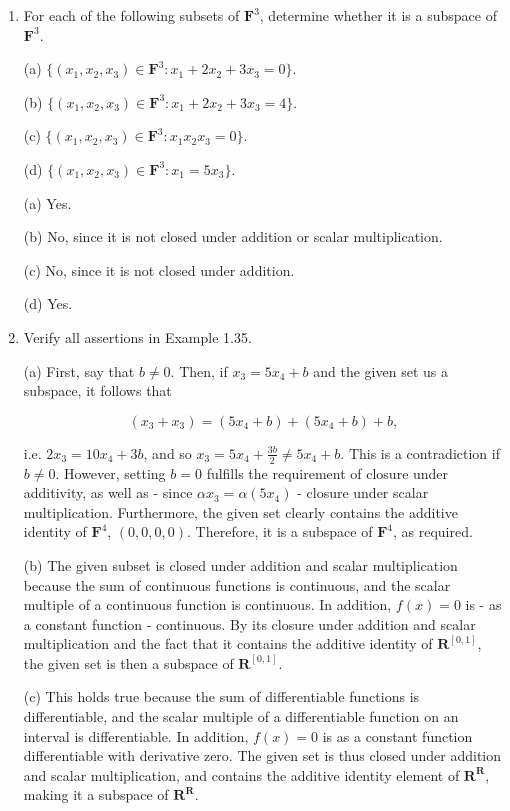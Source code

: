 \documentclass{book}
\begin{document}
\begin{enumerate}

\item For each of the following subsets of \(\textbf{F}^3\), determine whether it is a subspace of \(\textbf{F}^3\).

(a) \(\{(x_1,x_2,x_3) \in \textbf{F}^3:x_1+2x_2+3x_3=0\}\).

(b) \(\{(x_1,x_2,x_3) \in \textbf{F}^3:x_1+2x_2+3x_3=4\}\).

(c) \(\{(x_1,x_2,x_3) \in \textbf{F}^3:x_1x_2x_3=0\}\).

(d) \(\{(x_1,x_2,x_3) \in \textbf{F}^3:x_1=5x_3\}\).

(a) Yes.

(b) No, since it is not closed under addition or scalar multiplication.

(c) No, since it is not closed under addition.

(d) Yes.

\item Verify all assertions in Example 1.35.

(a) First, say that \(b \neq 0\).  Then, if \(x_3 = 5x_4 + b\) and the given set us a subspace, it follows that

\begin{equation*}
    (x_3 + x_3) = (5x_4 + b) + (5x_4 + b) + b,
\end{equation*}

i.e. \(2x_3 = 10x_4 + 3b\), and so \(x_3 = 5x_4 + \frac{3b}{2} \neq 5x_4 + b\).  This is a contradiction if \(b \neq 0\).  However, setting \(b = 0\) fulfills the requirement of closure under additivity, as well as - since \(\alpha x_3 = \alpha (5x_4)\) - closure under scalar multiplication.  Furthermore, the given set clearly contains the additive identity of \(\textbf{F}^4\), \((0,0,0,0)\).  Therefore, it is a subspace of \(\textbf{F}^4\), as required.

(b) The given subset is closed under addition and scalar multiplication because the sum of continuous functions is continuous, and the scalar multiple of a continuous function is continuous.  In addition, \(f(x)=0\) is - as a constant function - continuous.  By its closure under addition and scalar multiplication and the fact that it contains the additive identity of \(\textbf{R}^{[0,1]}\), the given set is then a subspace of \(\textbf{R}^{[0,1]}\).

(c) This holds true because the sum of differentiable functions is differentiable, and the scalar multiple of a differentiable function on an interval is differentiable.  In addition, \(f(x)=0\) is as a constant function differentiable with derivative zero.  The given set is thus closed under addition and scalar multiplication, and contains the additive identity element of \(\textbf{R}^{\textbf{R}}\), making it a subspace of \(\textbf{R}^{\textbf{R}}\).


\end{enumerate}
\end{document}
